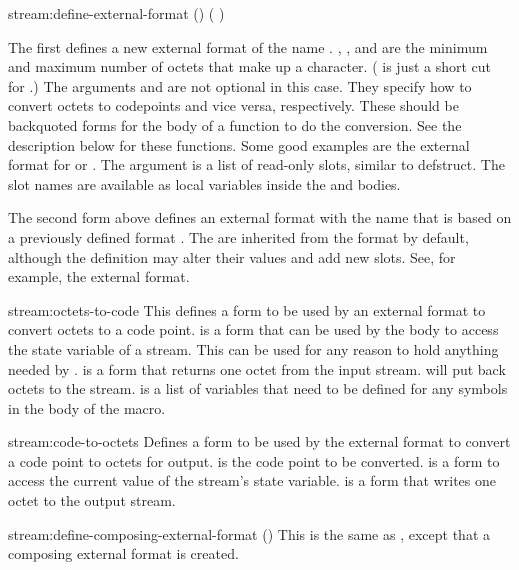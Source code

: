 \begin{defmac}[base]{stream:}{define-external-format}{\args {}
    () (\amprest{} )
    }

  The first defines a new external format of the name .
  , , and  are the minimum and maximum
  number of octets that make up a character.  ( is
  just a short cut for .)  The arguments
   and  are not optional in
  this case.  They specify how to convert octets to codepoints and
  vice versa, respectively.  These should be backquoted forms for the
  body of a function to do the conversion.  See the description below
  for these functions.  Some good examples are the external format for
   or .  The  argument is a list of
  read-only slots, similar to defstruct.  The slot names are available as
  local variables inside the  and 
  bodies.

  The second form above defines an external format with the name
   that is based on a previously defined format .
  The  are inherited from the  format by default,
  although the definition may alter their values and add new slots.
  See, for example, the  external format.

\end{defmac}

\begin{defmac}{stream:}{octets-to-code}{\args {} 
     \amprest{} }
  This defines a form to be used by an external format to convert
  octets to a code point.   is a form that can be used by
  the body to access the state variable of a stream.  This can be used
  for any reason to hold anything needed by .
   is a form that returns one octet from the input stream.
   will put back  octets to the stream.   is a
  list of variables that need to be defined for any symbols in the
  body of the macro.
\end{defmac}

\begin{defmac}{stream:}{code-to-octets}{\args {} 
     \amprest{} }
  Defines a form to be used by the external format to convert a code
  point to octets for output.   is the code point to be
  converted.   is a form to access the current value of the
  stream's state variable.   is a form that writes one
  octet to the output stream.
\end{defmac}

\begin{defmac}{stream:}{define-composing-external-format}{\args {}
    () 
    }
  This is the same as , except that a
  composing external format is created.
\end{defmac}
